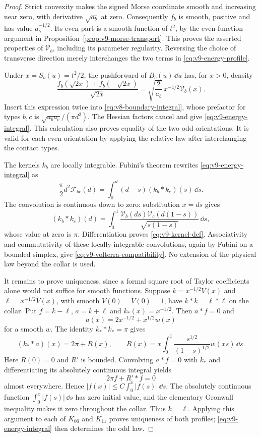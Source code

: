 \begin{proof}
Strict convexity makes the signed Morse coordinate smooth and
increasing near zero, with derivative $\sqrt{a_b}$ at zero.
Consequently $f_b$ is smooth, positive and has value $a_b^{-1/2}$.
Its even part is a smooth function of $t^2$, by the even-function
argument in Proposition~\ref{prop:v9-morse-transport}. This proves
the asserted properties of $\mathcal V_b$, including its parameter
regularity. Reversing the choice of transverse direction merely
interchanges the two terms in \eqref{eq:v9-energy-profile}.

Under $x=S_b(u)=t^2/2$, the pushforward of $B_b(u)\,\dd u$ has,
for $x>0$, density
\[
 \frac{f_b(\sqrt{2x})+f_b(-\sqrt{2x})}{\sqrt{2x}}
       =\sqrt{\frac2{a_b}}\,x^{-1/2}\mathcal V_b(x).
\]
Insert this expression twice into
\eqref{eq:v8-boundary-integral}, whose prefactor for types $b,c$
is $\sqrt{a_ba_c}/(\pi d^2)$. The Hessian factors cancel and give
\eqref{eq:v9-energy-integral}. This calculation also proves equality
of the two odd orientations. It is valid for each even orientation
by applying the relative law after interchanging the contact types.

The kernels $k_b$ are locally integrable. Fubini's theorem rewrites
\eqref{eq:v9-energy-integral} as
\[
 \frac\pi2d^2\mathcal F_{bc}(d)
                  =\int_0^d(d-s)(k_b*k_c)(s)\,\dd s.
\]
The convolution is continuous down to zero: substitution $x=ds$
gives
\[
 (k_b*k_c)(d)=\int_0^1
       \frac{\mathcal V_b(ds)\mathcal V_c(d(1-s))}{\sqrt{s(1-s)}}
                                                         \,\dd s,
\]
whose value at zero is $\pi$. Differentiation proves
\eqref{eq:v9-kernel-def}. Associativity and commutativity of these
locally integrable convolutions, again by Fubini on a bounded
simplex, give \eqref{eq:v9-volterra-compatibility}. No extension of
the physical law beyond the collar is used.

It remains to prove uniqueness, since a formal square root of Taylor
coefficients alone would not suffice for smooth functions. Suppose
$k=x^{-1/2}V(x)$ and $\ell=x^{-1/2}\widetilde V(x)$, with smooth
$V(0)=\widetilde V(0)=1$, have $k*k=\ell*\ell$ on the collar.
Put $f=k-\ell$, $a=k+\ell$ and $k_*(x)=x^{-1/2}$. Then
$a*f=0$ and
\[
 a(x)=2x^{-1/2}+x^{1/2}w(x)
\]
for a smooth $w$. The identity $k_* * k_* =\pi$ gives
\[
 (k_* * a)(x)=2\pi+R(x),\qquad
 R(x)=x\int_0^1\frac{s^{1/2}}{(1-s)^{1/2}}w(xs)\,\dd s.
\]
Here $R(0)=0$ and $R'$ is bounded. Convolving $a*f=0$ with
$k_*$ and differentiating its absolutely continuous integral yields
\[
                    2\pi f+R'*f=0
\]
almost everywhere. Hence
$|f(x)|\le C\int_0^x|f(s)|\,\dd s$.
The absolutely continuous function $\int_0^x|f(s)|\,\dd s$ has
zero initial value, and the elementary Gronwall inequality makes it
zero throughout the collar. Thus $k=\ell$. Applying this argument
to each of $K_{00}$ and $K_{11}$ proves uniqueness of both profiles;
\eqref{eq:v9-energy-integral} then determines the odd law.
\end{proof}

